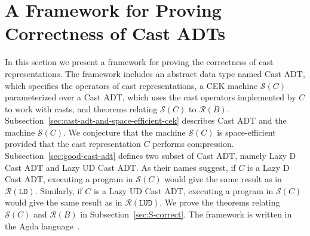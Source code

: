 \documentclass[runningheads]{llncs}
\newcommand{\RMachine}[1]{\ensuremath{\mathcal{R}(#1)}}
\newcommand{\LDMachine}{\RMachine{\BLD}}
\newcommand{\LUDMachine}{\RMachine{\BLUD}}
\newcommand{\SMachine}[1]{\ensuremath{\mathcal{S}(#1)}}
\newcommand{\BLD}[0]{\ensuremath{\mathtt{LD}}}
\newcommand{\BLUD}[0]{\ensuremath{\mathtt{LUD}}}
\begin{document}
\section{A Framework for Proving Correctness of Cast ADTs}
\label{sec:framework}

In this section we present a framework for proving the 
correctness of cast representations. The framework includes an abstract data 
type named Cast ADT, which specifies the operators of cast representations, 
a CEK machine $\SMachine{C}$ parameterized over a Cast ADT,
which uses the cast operators implemented by $C$ to work with casts, 
and theorems relating $\SMachine{C}$ to $\RMachine{B}$.
%
Subsection~\ref{sec:cast-adt-and-space-efficient-cek} describes Cast ADT and the 
machine \SMachine{C}. We conjecture that the machine \SMachine{C} is 
space-efficient provided that the cast representation $C$ performs compression.
%
Subsection~\ref{sec:good-cast-adt} defines two subset of Cast ADT, namely Lazy D 
Cast ADT and Lazy UD Cast ADT. As their names suggest, if $C$ is a Lazy D Cast 
ADT, executing a program in $\SMachine{C}$ would give the same result as in 
$\LDMachine$. Similarly, if $C$ is a Lazy UD Cast ADT, executing a program in 
$\SMachine{C}$ would give the same result as in $\LUDMachine$.
%
We prove the theorems relating \SMachine{C} and \RMachine{B} in
Subsection~\ref{sec:S-correct}.
The framework is written in the Agda language~\citep{norell2008dependently}.
\end{document}
